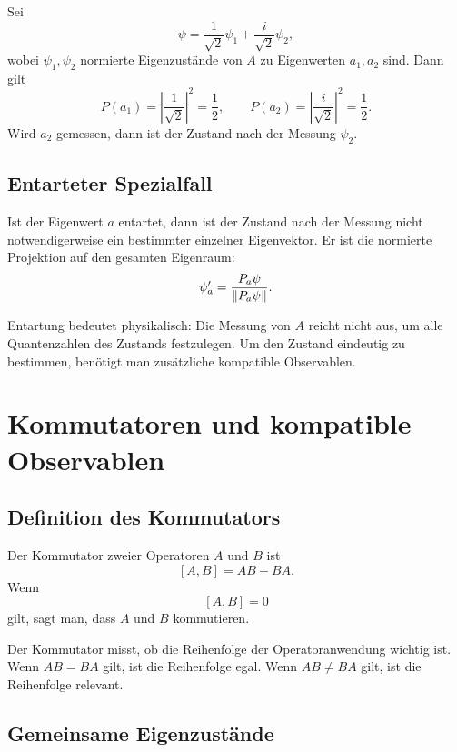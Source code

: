 \begin{examplebox}
Sei
\[
    \psi=\frac{1}{\sqrt2}\psi_1+\frac{i}{\sqrt2}\psi_2,
\]
wobei $\psi_1,\psi_2$ normierte Eigenzustände von $A$ zu Eigenwerten $a_1,a_2$ sind. Dann gilt
\[
    P(a_1)=\left|\frac{1}{\sqrt2}\right|^2=\frac12,
    \qquad
    P(a_2)=\left|\frac{i}{\sqrt2}\right|^2=\frac12.
\]
Wird $a_2$ gemessen, dann ist der Zustand nach der Messung $\psi_2$.
\end{examplebox}

\subsection{Entarteter Spezialfall}

Ist der Eigenwert $a$ entartet, dann ist der Zustand nach der Messung nicht notwendigerweise ein bestimmter einzelner Eigenvektor. Er ist die normierte Projektion auf den gesamten Eigenraum:
\[
    \psi_a'=\frac{P_a\psi}{\left\lVert P_a\psi \right\rVert}.
\]

\begin{notebox}
Entartung bedeutet physikalisch: Die Messung von $A$ reicht nicht aus, um alle Quantenzahlen des Zustands festzulegen. Um den Zustand eindeutig zu bestimmen, benötigt man zusätzliche kompatible Observablen.
\end{notebox}

\section{Kommutatoren und kompatible Observablen}

\subsection{Definition des Kommutators}

\begin{definitionbox}
Der Kommutator zweier Operatoren $A$ und $B$ ist
\[
    [A,B]=AB-BA.
\]
Wenn
\[
    [A,B]=0
\]
gilt, sagt man, dass $A$ und $B$ kommutieren.
\end{definitionbox}

Der Kommutator misst, ob die Reihenfolge der Operatoranwendung wichtig ist. Wenn $AB=BA$ gilt, ist die Reihenfolge egal. Wenn $AB\ne BA$ gilt, ist die Reihenfolge relevant.

\subsection{Gemeinsame Eigenzustände}

